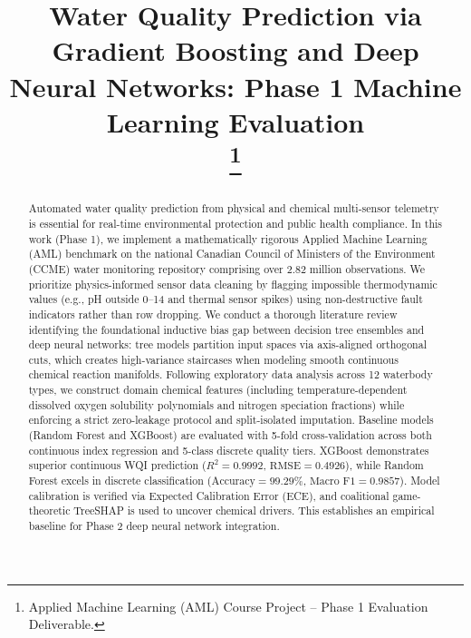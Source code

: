 \documentclass[conference]{IEEEtran}
\begin{document}
\title{Water Quality Prediction via Gradient Boosting and Deep Neural Networks: Phase 1 Machine Learning Evaluation\\
\thanks{Applied Machine Learning (AML) Course Project -- Phase 1 Evaluation Deliverable.}
}

\author{
}

\maketitle

\begin{abstract}
Automated water quality prediction from physical and chemical multi-sensor telemetry is essential for real-time environmental protection and public health compliance. In this work (Phase 1), we implement a mathematically rigorous Applied Machine Learning (AML) benchmark on the national Canadian Council of Ministers of the Environment (CCME) water monitoring repository comprising over 2.82 million observations. We prioritize physics-informed sensor data cleaning by flagging impossible thermodynamic values (e.g., pH outside 0--14 and thermal sensor spikes) using non-destructive fault indicators rather than row dropping. We conduct a thorough literature review identifying the foundational inductive bias gap between decision tree ensembles and deep neural networks: tree models partition input spaces via axis-aligned orthogonal cuts, which creates high-variance staircases when modeling smooth continuous chemical reaction manifolds. Following exploratory data analysis across 12 waterbody types, we construct domain chemical features (including temperature-dependent dissolved oxygen solubility polynomials and nitrogen speciation fractions) while enforcing a strict zero-leakage protocol and split-isolated imputation. Baseline models (Random Forest and XGBoost) are evaluated with 5-fold cross-validation across both continuous index regression and 5-class discrete quality tiers. XGBoost demonstrates superior continuous WQI prediction ($R^2 = 0.9992$, $\text{RMSE} = 0.4926$), while Random Forest excels in discrete classification ($\text{Accuracy} = 99.29\%$, $\text{Macro F1} = 0.9857$). Model calibration is verified via Expected Calibration Error (ECE), and coalitional game-theoretic TreeSHAP is used to uncover chemical drivers. This establishes an empirical baseline for Phase 2 deep neural network integration.
\end{abstract}
\end{document}
